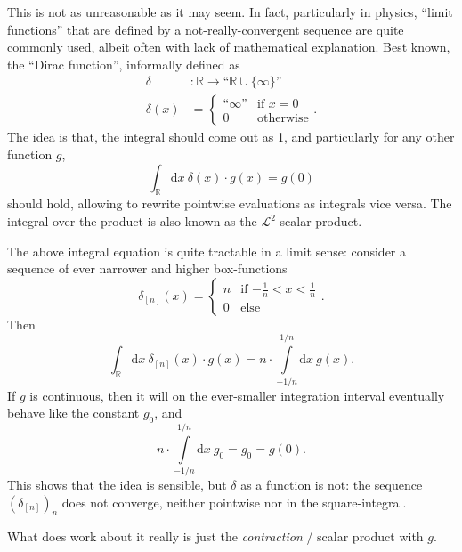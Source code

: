 \documentclass[sigplan,screen]{acmart}
\theoremstyle{acmplain}
\theoremstyle{acmdefinition}
\begin{document}
This is not as unreasonable as it may seem. In fact, particularly in physics, “limit functions” that are defined by a not-really-convergent sequence are quite commonly used, albeit often with lack of mathematical explanation. Best known, the “Dirac function”, informally defined as
\begin{align*}
  \delta &\colon \mathbb{R} \to “\mathbb{R}\cup\{\infty\}”
 \\
  \delta(x) &= \begin{cases} “\infty” & \text{if }x=0
                          \\ 0        & \text{otherwise} \end{cases}.
\end{align*}
The idea is that, the integral should come out as 1, and particularly for any other function $g$,
\[
  \int_\mathbb{R}\!\mathrm{d}x\: \delta(x)\cdot g(x) = g(0)
\]
should hold, allowing to rewrite pointwise evaluations as integrals vice versa. The integral over the product is also known as the $\mathcal{L}^2$ scalar product.

The above integral equation is quite tractable in a limit sense: consider a sequence of ever narrower and higher box-functions
\[
  \delta_{[n]}(x) = \begin{cases}
                           n   & \text{if $-\tfrac1n<x<\tfrac1n$}
                        \\ 0   & \text{else}
                       \end{cases}.
\]
Then
\[
  \int_\mathbb{R}\!\mathrm{d}x\: \delta_{[n]}(x)\cdot g(x)
    = n\cdot\int\limits_{-1/n}^{1/n}\mathrm{d}x\: g(x).
\]
If $g$ is continuous, then it will on the ever-smaller integration interval eventually behave like the constant $g_0$, and
\[
  n\cdot\int\limits_{-1/n}^{1/n}\mathrm{d}x\: g_0 = g_0 = g(0).
\]
This shows that the idea is sensible, but $\delta$ as a function is not: the sequence $(\delta_{[n]})_n$ does not converge, neither pointwise nor in the square-integral.

What does work about it really is just the \emph{contraction} / scalar product with $g$. 
\end{document}

